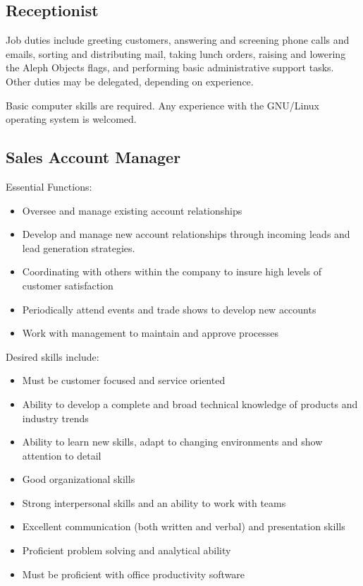 \subsection{Receptionist}
Job duties include greeting customers, answering and screening phone calls and emails, sorting and distributing mail, taking lunch orders, raising and lowering the Aleph Objects flags, and performing basic administrative support tasks. Other duties may be delegated, depending on experience.

Basic computer skills are required. Any experience with the GNU/Linux operating system is welcomed.

\subsection{Sales Account Manager}
Essential Functions:
\begin{itemize}
 \item Oversee and manage existing account relationships
 \item Develop and manage new account relationships through incoming leads and lead generation strategies.
 \item Coordinating with others within the company to insure high levels of customer satisfaction
 \item Periodically attend events and trade shows to develop new accounts
 \item Work with management to maintain and approve processes
\end{itemize}

Desired skills include:
\begin{itemize}
 \item Must be customer focused and service oriented
 \item Ability to develop a complete and broad technical knowledge of products and industry trends
 \item Ability to learn new skills, adapt to changing environments and show attention to detail
 \item Good organizational skills
 \item Strong interpersonal skills and an ability to work with teams
 \item Excellent communication (both written and verbal) and presentation skills
 \item Proficient problem solving and analytical ability
 \item Must be proficient with office productivity software
\end{itemize}

